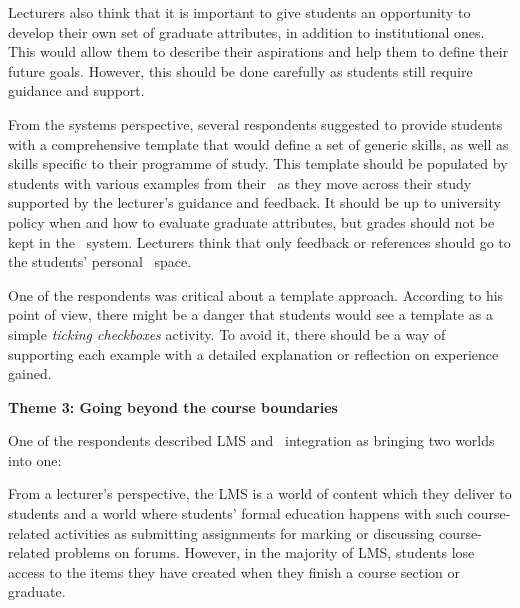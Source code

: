 Lecturers also think that it is important to give students an opportunity to
develop their own set of graduate attributes, in addition to institutional ones.
This would allow them to describe their aspirations and help them to define
their future goals. However, this should be done carefully as students still
require guidance and support.


From the systems perspective, several respondents suggested to provide students
with a comprehensive template that would define a set of generic \LLLs skills,
as well as skills specific to their programme of study. This template should be
populated by students with various examples from their \ep~as they move across
their study supported by the lecturer's guidance and feedback. It should be up
to university policy when and how to evaluate graduate attributes, but grades
should not be kept in the \ep~system. Lecturers think that only feedback or
references should go to the students' personal \ep~space.

One of the respondents was critical about a template approach. According to his
point of view, there might be a danger that students would see a template as a
simple \textit{ticking checkboxes} activity. To avoid it, there should be a way
of supporting each example with a detailed explanation or reflection on
experience gained.

\textbf{Theme 3: Going beyond the course boundaries}

One of the respondents described LMS and \ep~integration as bringing two
worlds into one:


From a lecturer's perspective, the LMS is a world of content which they deliver
to students and a world where students' formal education happens with such
course-related activities as submitting assignments for marking or discussing
course-related problems on forums. However, in the majority of LMS, students
lose access to the items they have created when they finish a course section or
graduate.

